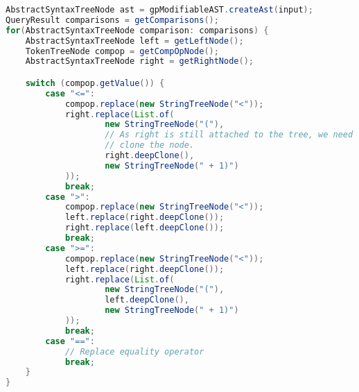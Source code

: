 \begin{lstlisting}[language=Java, caption=Code transpilation]
AbstractSyntaxTreeNode ast = gpModifiableAST.createAst(input);
QueryResult comparisons = getComparisons();
for(AbstractSyntaxTreeNode comparison: comparisons) {
    AbstractSyntaxTreeNode left = getLeftNode();
    TokenTreeNode compop = getCompOpNode();
    AbstractSyntaxTreeNode right = getRightNode();

    switch (compop.getValue()) {
        case "<=":
            compop.replace(new StringTreeNode("<"));
            right.replace(List.of(
                    new StringTreeNode("("),
                    // As right is still attached to the tree, we need to
                    // clone the node.
                    right.deepClone(),
                    new StringTreeNode(" + 1)")
            ));
            break;
        case ">":
            compop.replace(new StringTreeNode("<"));
            left.replace(right.deepClone());
            right.replace(left.deepClone());
            break;
        case ">=":
            compop.replace(new StringTreeNode("<"));
            left.replace(right.deepClone());
            right.replace(List.of(
                    new StringTreeNode("("),
                    left.deepClone(),
                    new StringTreeNode(" + 1)")
            ));
            break;
        case "==":
            // Replace equality operator
            break;
    }
}
\end{lstlisting}